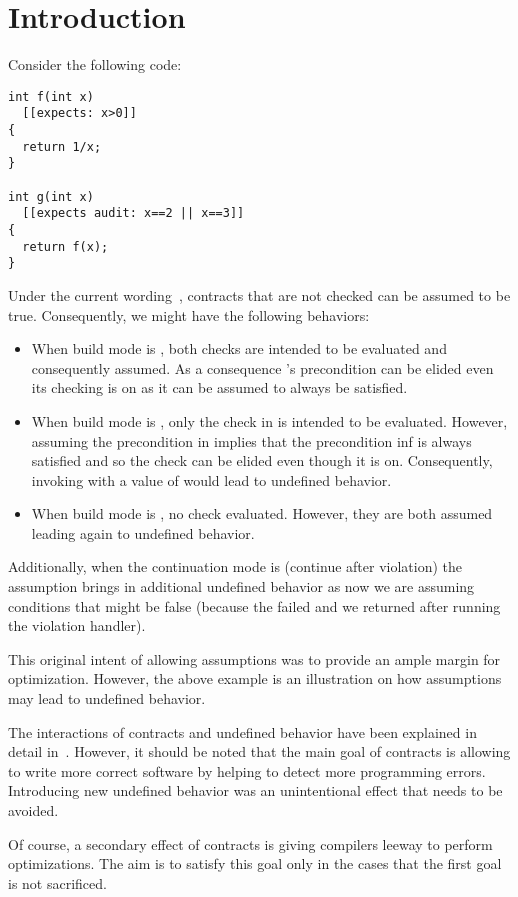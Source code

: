 \section{Introduction}

Consider the following code:

\begin{lstlisting}
int f(int x)
  [[expects: x>0]]
{
  return 1/x;
}

int g(int x)
  [[expects audit: x==2 || x==3]]
{
  return f(x);
}
\end{lstlisting}

Under the current wording~\cite{p0542r5}, contracts that are not checked can be assumed to be
true. Consequently, we might have the following behaviors:

\begin{itemize}
  \item When build mode is , both checks are intended to be evaluated and
consequently assumed. As a consequence 's precondition 
can be elided even its checking is on
as it can be assumed to always be satisfied.
  \item When build mode is , only the check in 
is intended to be evaluated. However, assuming the precondition in  implies that
the precondition inf  is always satisfied and so the check can be elided 
even though it is on. 
Consequently, invoking
 with a value of  would lead to undefined behavior.
  \item When build mode is , no check evaluated. However, they are
both assumed leading again to undefined behavior.
\end{itemize}

Additionally, when the continuation mode is  (continue after violation)
the assumption brings in additional undefined behavior as now we are assuming conditions
that might be false (because the failed and we returned after running the violation
handler).

This original intent of allowing assumptions was to provide an ample margin for
optimization. However, the above example is an illustration on how assumptions
may lead to undefined behavior.

The interactions of contracts and undefined behavior have been explained in
detail in~\cite{p1321r0}. However, it should be noted that the main goal of
contracts is allowing to write more correct software by helping to detect more
programming errors. Introducing new undefined behavior was an unintentional
effect that needs to be avoided.

Of course, a secondary effect of contracts is giving compilers leeway to perform
optimizations. The aim is to satisfy this goal only in the cases that the first goal
is not sacrificed.

